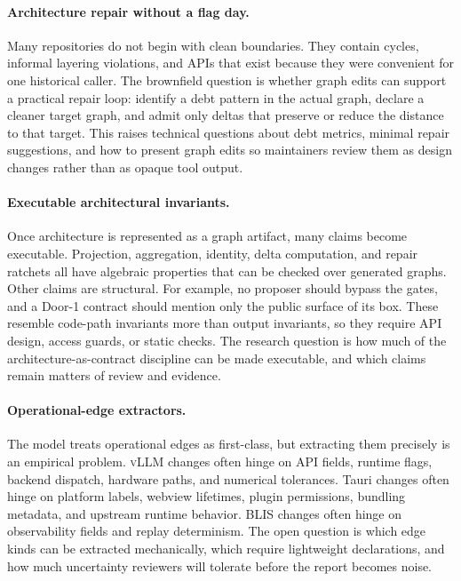 \documentclass[sigconf,review,anonymous]{acmart}
\theoremstyle{plain}
\theoremstyle{definition}
\begin{document}
\paragraph{Architecture repair without a flag day.}
Many repositories do not begin with clean boundaries. They contain cycles,
informal layering violations, and APIs that exist because they were convenient
for one historical caller. The brownfield question is whether graph edits can
support a practical repair loop: identify a debt pattern in the actual graph,
declare a cleaner target graph, and admit only deltas that preserve or reduce
the distance to that target. This raises technical questions about debt metrics,
minimal repair suggestions, and how to present graph edits so maintainers review
them as design changes rather than as opaque tool output.

\paragraph{Executable architectural invariants.}
Once architecture is represented as a graph artifact, many claims become
executable. Projection, aggregation, identity, delta computation, and repair
ratchets all have algebraic properties that can be checked over generated
graphs. Other claims are structural. For example, no proposer should bypass the
gates, and a Door-1 contract should mention only the public surface of its box.
These resemble code-path invariants more than output invariants, so they require
API design, access guards, or static checks. The research question is how much
of the architecture-as-contract discipline can be made executable, and which
claims remain matters of review and evidence.

\paragraph{Operational-edge extractors.}
The model treats operational edges as first-class, but extracting them precisely
is an empirical problem. \textsc{vLLM} changes often hinge on API fields,
runtime flags, backend dispatch, hardware paths, and numerical tolerances. Tauri
changes often hinge on platform labels, webview lifetimes, plugin permissions,
bundling metadata, and upstream runtime behavior. BLIS changes often hinge on
observability fields and replay determinism. The open question is which edge
kinds can be extracted mechanically, which require lightweight declarations, and
how much uncertainty reviewers will tolerate before the report becomes noise.
\end{document}
